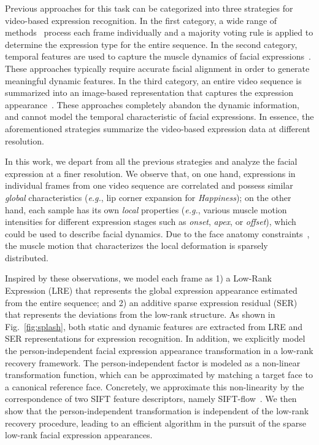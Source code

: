 \documentclass[journal]{IEEEtran}
\begin{document}
Previous approaches for this task can be categorized into three strategies for video-based expression recognition. In the first category, a wide range of methods~\cite{Bartlett_FG11,Valstar_SMCB12} process each frame individually and a majority voting rule is applied to determine the expression type for the entire sequence. In the second category, temporal features are used to capture the muscle dynamics of facial expressions~\cite{Zhao_PAMI07,Huang11}. These approaches typically require accurate facial alignment in order to generate meaningful dynamic features. In the third category, an entire video sequence is summarized into an image-based representation that captures the expression appearance~\cite{Yang_SMCB12,Dahmane_TMM14}. These approaches completely abandon the dynamic information, and cannot model the temporal characteristic of facial expressions. In essence, the aforementioned strategies summarize the video-based expression data at different resolution. 

In this work, we depart from all the previous strategies and analyze the facial expression at a finer resolution. We observe that, on one hand, expressions in individual frames from one video sequence are correlated and possess similar \textit{global} characteristics (\textit{e.g.}, lip corner expansion for \textit{Happiness}); on the other hand, each sample has its own \textit{local} properties (\textit{e.g.}, various muscle motion intensities for different expression stages such as \textit{onset}, \textit{apex}, or \textit{offset}), which could be used to describe facial dynamics. Due to the face anatomy constraints~\cite{Ekman78}, the muscle motion that characterizes the local deformation is sparsely distributed. 

Inspired by these observations, we model each frame as 1) a Low-Rank Expression (LRE) that represents the global expression appearance estimated from the entire sequence; and 2) an additive sparse expression residual (SER) that represents the deviations from the low-rank structure. As shown in Fig.~\ref{fig:splash}, both static and dynamic features are extracted from LRE and SER representations for expression recognition. In addition, we explicitly model the person-independent facial expression appearance transformation in a low-rank recovery framework. The person-independent factor is modeled as a non-linear transformation function, which can be approximated by matching a target face to a canonical reference face. Concretely, we approximate this non-linearity by the correspondence of two SIFT feature descriptors, namely SIFT-flow~\cite{Liu_PAMI11}. We then show that the person-independent transformation is independent of the low-rank recovery procedure, leading to an efficient algorithm in the pursuit of the sparse low-rank facial expression appearances. 
\end{document}
